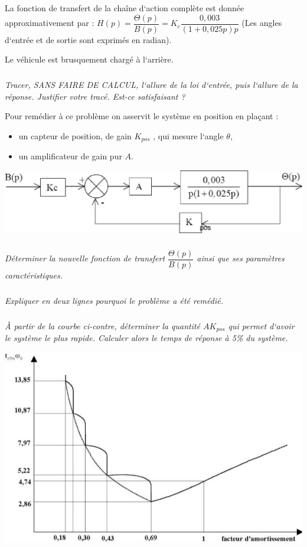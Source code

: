 \documentclass[11pt,oneside]{article}
\begin{document}
La fonction de transfert de la chaîne d‘action complète est donnée
approximativement par :
$H(p)=\dfrac{\Theta(p)}{B(p)}=K_c\dfrac{0,003}{\left(1+0,025p \right)p}$    
(Les angles d‘entrée et de sortie sont exprimés en radian).

Le véhicule est brusquement chargé à l‘arrière.

\subparagraph{}
\textit{Tracer, SANS FAIRE DE CALCUL, l‘allure de la loi d‘entrée, puis l‘allure
de la réponse.
Justifier votre tracé. Est-ce satisfaisant ?
}

Pour remédier à ce problème on asservit le système en position en plaçant :
\begin{itemize}
 \item un capteur de position, de gain $K_{pos}$ , qui mesure l‘angle $\theta$,
\item un amplificateur de gain pur $A$.
\end{itemize}

\begin{center}
 \includegraphics[width=.6\textwidth]{png/image6}
\end{center}

\subparagraph{}
\textit{Déterminer la nouvelle fonction de transfert $\dfrac{\Theta(p)}{B(p)}$
ainsi que ses paramètres caractéristiques.
}

\subparagraph{}
\textit{Expliquer en deux lignes pourquoi le problème a été remédié.}

\subparagraph{}
\textit{À partir de la courbe ci-contre, déterminer la quantité $AK_{pos}$ qui
permet d‘avoir le système le plus rapide. Calculer alors le temps de réponse à
5\% du système.}

\begin{center}
 \includegraphics[width=.6\textwidth]{png/image7}
\end{center}
\end{document}
